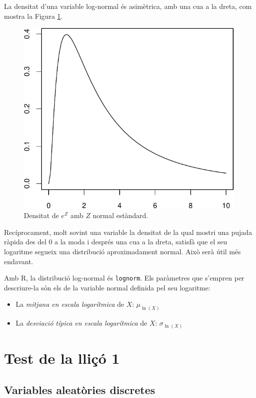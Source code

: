\documentclass[
]{book}
\theoremstyle{definition}
\theoremstyle{definition}
\theoremstyle{definition}
\theoremstyle{remark}
\begin{document}
La densitat d'una variable log-normal és asimètrica, amb una cua a la dreta, com mostra la Figura \ref{fig:lognorm}.

\begin{figure}

{\centering \includegraphics[width=0.5\linewidth]{Bioestadistica-II_files/figure-latex/lognorm-1} 

}

\caption{Densitat de $e^Z$ amb $Z$ normal estàndard.}\label{fig:lognorm}
\end{figure}

Recíprocament, molt sovint una variable la densitat de la qual mostri una pujada ràpida des del 0 a la moda i després una cua a la dreta, satisfà que el seu logaritme segueix una distribució aproximadament normal. Això serà útil més endavant.

Amb R, la distribució log-normal és \texttt{lognorm}. Els paràmetres que s'empren per descriure-la són els de la variable normal definida pel seu logaritme:

\begin{itemize}
\item
  La \emph{mitjana en escala logarítmica} de \(X\): \(\mu_{\ln(X)}\)
\item
  La \emph{desviació típica en escala logarítmica} de \(X\): \(\sigma_{\ln(X)}\)
\end{itemize}

\hypertarget{test-de-la-lliuxe7uxf3-1}{%
\section{Test de la lliçó 1}\label{test-de-la-lliuxe7uxf3-1}}

\hypertarget{variables-aleatuxf2ries-discretes-1}{%
\subsection{Variables aleatòries discretes}\label{variables-aleatuxf2ries-discretes-1}}
\end{document}
